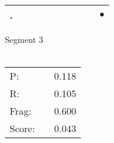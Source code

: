 \documentclass[landscape]{article}
\newcommand{\ssp}{\hspace{2pt}}
\newcommand{\mex}{\cellcolor{g}$\bullet$}
\begin{document}
\begin{tabular}{|l|p{10pt}|p{10pt}|p{10pt}|p{10pt}|p{10pt}|p{10pt}|p{10pt}|p{10pt}|p{10pt}|}
\hline
\ssp \cellcolor{ref8}. \ssp&\hspace{2pt}&\hspace{2pt}&\hspace{2pt}&\hspace{2pt}&\hspace{2pt}&\hspace{2pt}&\hspace{2pt}&\hspace{2pt}&\hspace{2pt}\mex\\
\hline
\end{tabular}

\vspace{6pt}
\noindent Segment 3\\\\
\noindent\begin{tabular}{lm{12pt}r}
\hline
P:&&0.118\\
R:&&0.105\\
Frag:&&0.600\\
Score:&&0.043\\
\end{tabular}

\newpage
\end{document}
